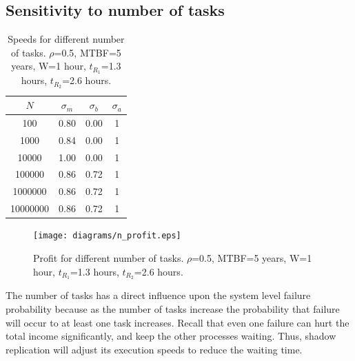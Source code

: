 \subsection{Sensitivity to number of tasks}


\begin{table}[!h]\small
	\caption{Speeds for different number of tasks. $\rho$=0.5, MTBF=5 years, W=1 hour, $t_{R_1}$=1.3 hours, $t_{R_2}$=2.6 hours.}
	\centering
		\begin{tabular}{|c|c|c|c|}
		\hline
		$N$ & $\sigma_m$ & $\sigma_b$ & $\sigma_a$ \\
		\hline
		100			&	0.80	&	0.00	&	1 \\
		\hline
		1000		&	0.84	&	0.00	&	1 \\
		\hline
		10000		&	1.00	&	0.00	&	1 \\
		\hline
		100000		&	0.86	&	0.72	&	1 \\
		\hline
		1000000		&	0.86	&	0.72	&	1 \\
		\hline
		10000000	&	0.86	&	0.72	&   1 \\
		\hline
		\end{tabular}
	\label{tbl:n}
\end{table}

\begin{figure}[!h]	
	\begin{center}
			\texttt{[image: diagrams/n\_profit.eps]}
	\end{center}
	\caption{Profit for different number of tasks. $\rho$=0.5, MTBF=5 years, W=1 hour, $t_{R_1}$=1.3 hours, $t_{R_2}$=2.6 hours.}
	\label{fig:n}
\end{figure}

The number of tasks has a direct influence upon the system level
failure probability because as the number of tasks increase the
probability that failure will occur to at least one task
increases. Recall that even one failure can hurt the total income
significantly, and keep the other processes waiting. Thus, shadow
replication will adjust its execution speeds to reduce the waiting
time.

